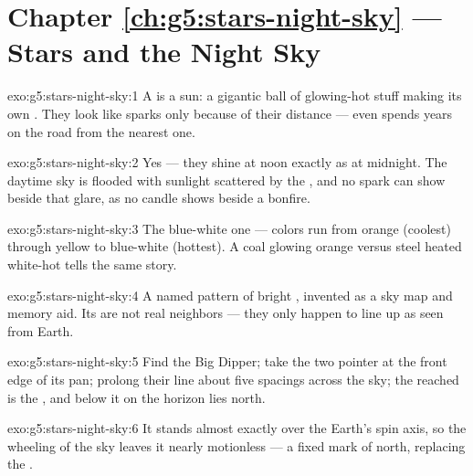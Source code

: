 \section*{Chapter \ref{ch:g5:stars-night-sky} --- Stars and the Night Sky}

\begin{solution}{exo:g5:stars-night-sky:1}
A  is a sun: a gigantic ball of glowing-hot stuff making its
own . They look like sparks only because of their distance ---
even  spends years on the road from the nearest one.
\end{solution}

\begin{solution}{exo:g5:stars-night-sky:2}
Yes --- they shine at noon exactly as at midnight. The daytime sky
is flooded with sunlight scattered by the , and no spark can
show beside that glare, as no candle shows beside a bonfire.
\end{solution}

\begin{solution}{exo:g5:stars-night-sky:3}
The blue-white one ---  colors run from orange (coolest)
through yellow to blue-white (hottest). A coal glowing orange
versus steel heated white-hot tells the same story.
\end{solution}

\begin{solution}{exo:g5:stars-night-sky:4}
A named pattern of bright , invented as a sky map and memory
aid. Its  are not real neighbors --- they only happen to line
up as seen from Earth.
\end{solution}

\begin{solution}{exo:g5:stars-night-sky:5}
Find the Big Dipper; take the two pointer  at the front edge
of its pan; prolong their line about five spacings across the sky;
the  reached is the , and below it on the horizon
lies north.
\end{solution}

\begin{solution}{exo:g5:stars-night-sky:6}
It stands almost exactly over the Earth's spin axis, so the
wheeling of the sky leaves it nearly motionless --- a fixed mark of
north, replacing the .
\end{solution}

